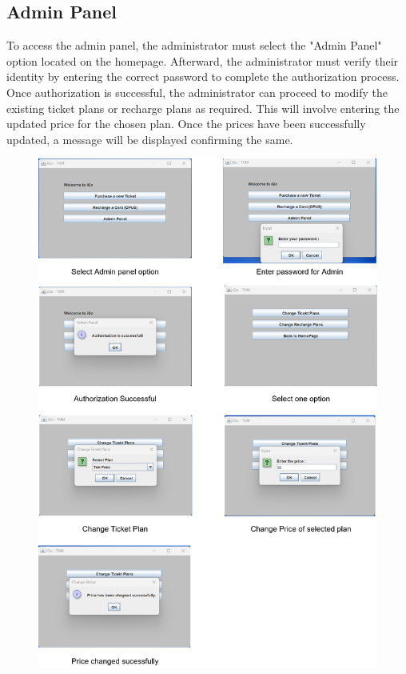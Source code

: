 \documentclass[a4paper, 11pt]{report}
\begin{document}
\subsection{Admin Panel}
To access the admin panel, the administrator must select the "Admin Panel" option located on the homepage. Afterward, the administrator must verify their identity by entering the correct password to complete the authorization process. Once authorization is successful, the administrator can proceed to modify the existing ticket plans or recharge plans as required. This will involve entering the updated price for the chosen plan. Once the prices have been successfully updated, a message will be displayed confirming the same.\\
\begin{figure}[h]
\centering
   \includegraphics[width=12cm]{5.png} 
\end{figure}
\clearpage
\end{document}
